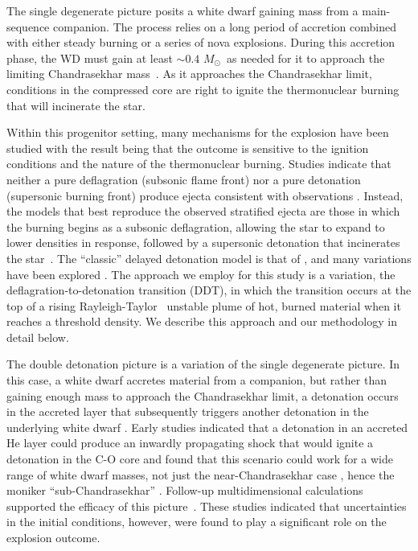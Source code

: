 \documentclass[iop,apj]{emulateapj}
\newcommand{\Msun}{\ensuremath{M_\odot}}
\begin{document}
The single degenerate picture posits a white dwarf gaining mass
from a main-sequence companion. The process relies on a long
period of accretion combined with either steady burning or a
series of nova explosions. {\color{blue} During this accretion phase, the WD must} gain at least
$\sim 0.4$ \Msun\ as needed for it to approach the
limiting Chandrasekhar mass~\citep{starrfieldetal2012}. As it approaches
the Chandrasekhar limit, conditions in the compressed core are right
to ignite the thermonuclear burning that will incinerate the star.

Within this progenitor setting, many mechanisms for the explosion have
been studied with the result being that the outcome is sensitive to
the ignition conditions and the nature of the thermonuclear burning.
Studies indicate that neither a pure deflagration (subsonic flame front)
nor a pure detonation (supersonic burning front) produce ejecta consistent
with observations \citep{arnett69,roepkeetal07}.  Instead, the models
that best reproduce the observed stratified ejecta are those in which
the burning begins as a subsonic deflagration, {\color{blue} allowing the star
to expand to lower densities in response, followed} by a
supersonic detonation that incinerates the
star~\citep{Nomo84,Khokhlov1991Delayed-detonat,HoefKhok96,GameKhokOran05}.
The ``classic'' delayed detonation model is that of
\citet{Khokhlov1991Delayed-detonat} \citep[See also][]{hoflich.khokhlov.ea:delayed,GameKhokOran05},
and many variations have been
explored \citep[and references therein]{hillebrandtetal2013,calderetal2013}.
The approach we employ for this study is a variation, the
deflagration-to-detonation transition (DDT), in which the transition
occurs at the top of a rising Rayleigh-Taylor~\citep{taylor+50,chandra+81}
unstable plume of hot, burned
material when it reaches a threshold density.
We describe this approach and our methodology in detail below.

The double detonation picture is a variation of the single degenerate picture.
In this case, a white dwarf accretes material from a companion, but rather
than gaining enough mass to approach the Chandrasekhar limit, a detonation
occurs in the accreted layer that subsequently triggers another detonation
in the underlying white dwarf \citep{woosleyweavertaam80,taam80a,taam80b,
nomoto80,nomoto82b}. Early studies indicated that a detonation in an
accreted He
layer could produce an inwardly propagating
shock that would ignite a detonation in the C-O core and found
that this scenario could work for a wide range of white dwarf
masses, not just the near-Chandrasekhar case \citep{livne90}, hence the
moniker ``sub-Chandrasekhar'' \citep{ww94}.
{\color{blue} Follow-up multidimensional calculations}
supported the
efficacy of this picture~\citep{livneglasner91, livnearnett95,HoefKhok96,
hoeflichetal96, wigginsfalle97,wigginsetal98,garciasenzbravowoosley99}.
These studies indicated that uncertainties in the initial conditions,
however, were found to play a significant role on the explosion outcome.
\end{document}
